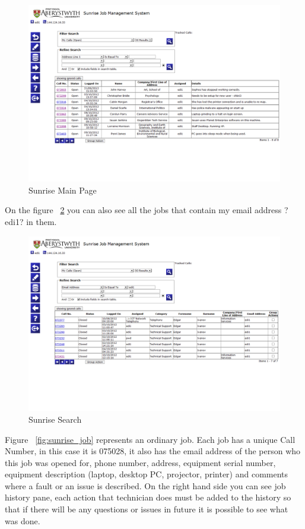\documentclass[10pt,a4paper,headinclude=true]{report}
\begin{document}
\begin{figure}[H]
\centering
\centerline{\includegraphics[scale=0.5]{./sunrise_main}}
\caption{Sunrise Main Page}
\label{fig:sunrise_main}
\end{figure}

On the figure ~\ref{fig:sunrise_search} you can also see all the jobs that contain my email address ?edi1? in them.

\begin{figure}[H]
\centering
\centerline{\includegraphics[scale=0.5]{./sunrise_search}}
\caption{Sunrise Search}
\label{fig:sunrise_search}
\end{figure}

Figure ~\ref{fig:sunrise_job} represents an ordinary job. Each job has a unique Call Number, in this case it is 075028, it also has the email address of the person who this job was opened for, phone number, address, equipment serial number, equipment description (laptop, desktop PC, projector, printer) and comments where a fault or an issue is described. On the right hand side you can see job history pane, each action that technician does must be added to the history so that if there will be any questions or issues in future it is possible to see what was done.
\end{document}
